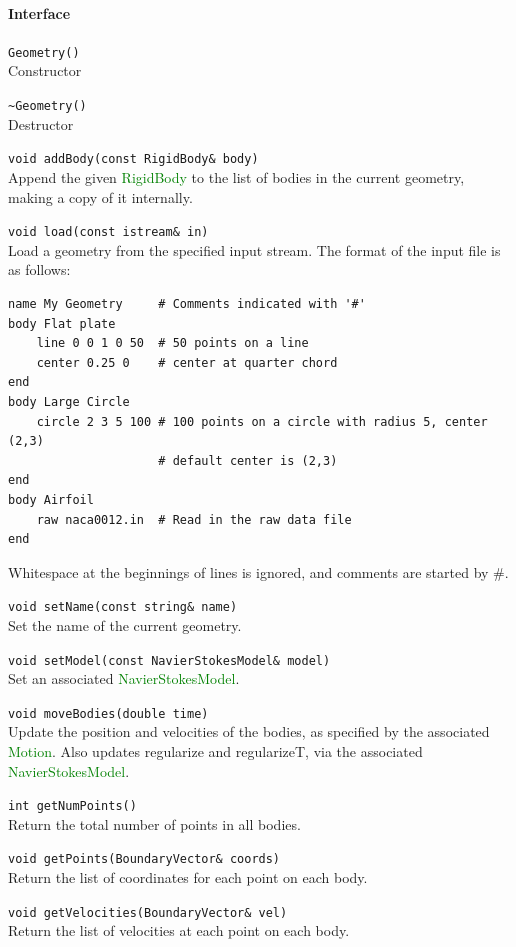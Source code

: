 \documentclass[11pt]{article}
\def\class#1{\textcolor{green}{\ttfamily\small #1}} %
\def\fn#1{{\ttfamily\small #1}} %
\let\code\lstinline
\begin{document}
\paragraph{Interface}
\begin{description}
	\item \code|Geometry()| \\
		Constructor
	\item \code|~Geometry()| \\
		Destructor
	\item \code|void addBody(const RigidBody& body)| \\
		Append the given \class{RigidBody} to the list of bodies in the current geometry, making a copy of it internally.
	\item \code|void load(const istream& in)| \\
		Load a geometry from the specified input stream.  The format of the input file is as follows:
\begin{verbatim}
name My Geometry     # Comments indicated with '#'
body Flat plate
    line 0 0 1 0 50  # 50 points on a line
    center 0.25 0    # center at quarter chord
end
body Large Circle
    circle 2 3 5 100 # 100 points on a circle with radius 5, center (2,3)
                     # default center is (2,3)
end
body Airfoil
    raw naca0012.in  # Read in the raw data file
end
\end{verbatim}
	 Whitespace at the beginnings of lines is ignored, and comments are started by \#.
	\item \code|void setName(const string& name)| \\
		Set the name of the current geometry.
	\item \code|void setModel(const NavierStokesModel& model)| \\
		Set an associated \class{NavierStokesModel}.
	\item \code|void moveBodies(double time)| \\
		Update the position and velocities of the bodies, as specified by the associated \class{Motion}.  Also updates \fn{regularize} and \fn{regularizeT}, via the associated \class{NavierStokesModel}.
	\item \code|int getNumPoints()| \\
		Return the total number of points in all bodies.
	\item \code|void getPoints(BoundaryVector& coords)| \\
		Return the list of coordinates for each point on each body.
	\item \code|void getVelocities(BoundaryVector& vel)| \\
		Return the list of velocities at each point on each body.		
\end{description}
\end{document}

